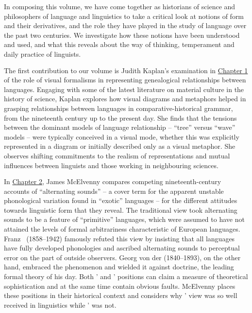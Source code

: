 \documentclass[output=paper]{langscibook}
\begin{document}
In composing this volume, we have come together as historians of science and philosophers of language and linguistics to take a critical look at notions of form and their derivatives, and the role they have played in the study of language over the past two centuries. We investigate how these notions have been understood and used, and what this reveals about the way of thinking, temperament and daily practice of linguists.

The first contribution to our volume is Judith Kaplan's examination in \hyperref[chap:kaplan]{Chapter 1} of the role of visual formalisms in representing genealogical relationships between languages. Engaging with some of the latest literature on material culture in the history of science, Kaplan explores how visual diagrams and metaphors helped in grasping relationships between languages in comparative-historical grammar, from the nineteenth century up to the present day. She finds that the tensions between the dominant models of language relationship -- ``tree'' versus ``wave'' models -- were typically conceived in a visual mode, whether this was explicitly represented in a diagram or initially described only as a visual metaphor. She observes shifting commitments to the realism of representations and mutual influences between linguists and those working in neighbouring sciences.

In \hyperref[chap:mcelvenny]{Chapter 2}, James McElvenny compares competing nineteenth-century accounts of ``alternating sounds'' -- a cover term for the apparent unstable phonological variation found in ``exotic'' languages -- for the different attitudes towards linguistic form that they reveal. The traditional view took alternating sounds to be a feature of ``primitive'' languages, which were assumed to have not attained the levels of formal arbitrariness characteristic of European languages. Franz {\Boas}~(1858--1942) famously refuted this view by insisting that all languages have fully developed phonologies and ascribed alternating sounds to perceptual error on the part of outside observers. Georg von der {\Gabelentz} (1840--1893), on the other hand, embraced the phenomenon and wielded it against {\Neogrammarian} doctrine, the leading formal theory of his day. Both {\Boas}' and {\Gabelentz}' positions can claim a measure of theoretical sophistication and at the same time contain obvious faults. McElvenny places these positions in their historical context and considers why {\Boas}' view was so well received in linguistics while {\Gabelentz}' was not.
\end{document}
